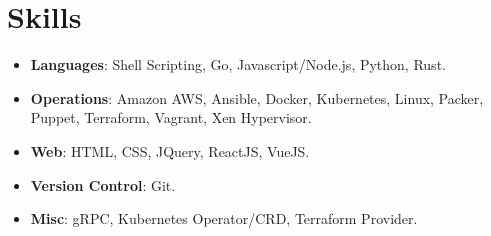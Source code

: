 \section*{Skills}
\begin{itemize}
	\item \textbf{Languages}: Shell Scripting, Go, Javascript/Node.js, Python, Rust.
	\item \textbf{Operations}: Amazon AWS, Ansible, Docker, Kubernetes, Linux, Packer, Puppet, Terraform, Vagrant, Xen Hypervisor.
	\item \textbf{Web}: HTML, CSS, JQuery, ReactJS, VueJS.
	\item \textbf{Version Control}: Git.
	\item \textbf{Misc}: gRPC, Kubernetes Operator/CRD, Terraform Provider.
\end{itemize}
